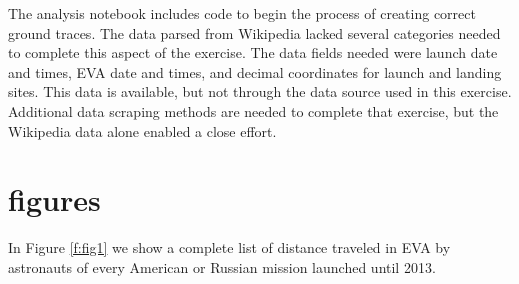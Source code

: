 \documentclass[sigconf]{acmart}
\begin{document}
The analysis notebook includes code to begin the process of creating correct ground traces. The data parsed from Wikipedia lacked several categories needed to complete this aspect of the exercise. The data fields needed were launch date and times, EVA date and times, and decimal coordinates for launch and landing sites. This data is available, but not through the data source used in this exercise. Additional data scraping methods are needed to complete that exercise, but the Wikipedia data alone enabled a close effort.




\section{figures}

In Figure \ref{f:fig1} we show a complete list of distance traveled in EVA by astronauts of every American or Russian mission launched until 2013. 
\end{document}
